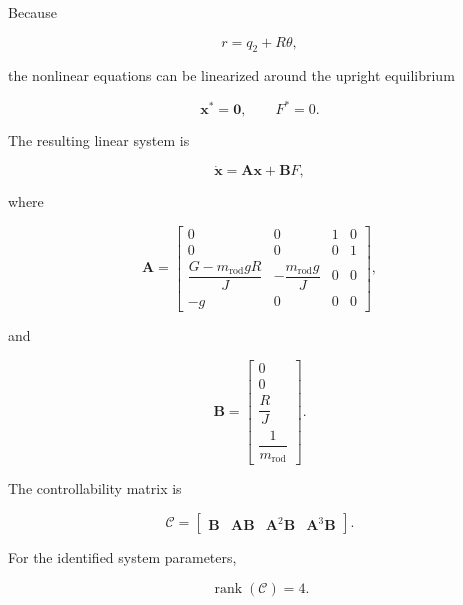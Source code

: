 Because

\begin{equation}
r=q_2+R\theta,
\end{equation}

the nonlinear equations can be linearized around the upright equilibrium

\begin{equation}
\mathbf{x}^{*}=\mathbf{0},
\qquad
F^{*}=0.
\end{equation}

The resulting linear system is

\begin{equation}
\dot{\mathbf{x}}
=
\mathbf{A}\mathbf{x}
+
\mathbf{B}F,
\label{eq:linear-controller-model}
\end{equation}

where

\begin{equation}
\mathbf{A}
=
\begin{bmatrix}
0 & 0 & 1 & 0 \\
0 & 0 & 0 & 1 \\
\dfrac{G-m_{\mathrm{rod}}gR}{J}
&
-\dfrac{m_{\mathrm{rod}}g}{J}
&
0 & 0
\\[3mm]
-g & 0 & 0 & 0
\end{bmatrix},
\label{eq:linear-controller-A}
\end{equation}

and

\begin{equation}
\mathbf{B}
=
\begin{bmatrix}
0 \\
0 \\
\dfrac{R}{J} \\[2mm]
\dfrac{1}{m_{\mathrm{rod}}}
\end{bmatrix}.
\label{eq:linear-controller-B}
\end{equation}

The controllability matrix is

\begin{equation}
\mathcal{C}
=
\begin{bmatrix}
\mathbf{B} &
\mathbf{AB} &
\mathbf{A}^{2}\mathbf{B} &
\mathbf{A}^{3}\mathbf{B}
\end{bmatrix}.
\end{equation}

For the identified system parameters,

\begin{equation}
\operatorname{rank}(\mathcal{C})=4.
\end{equation}

